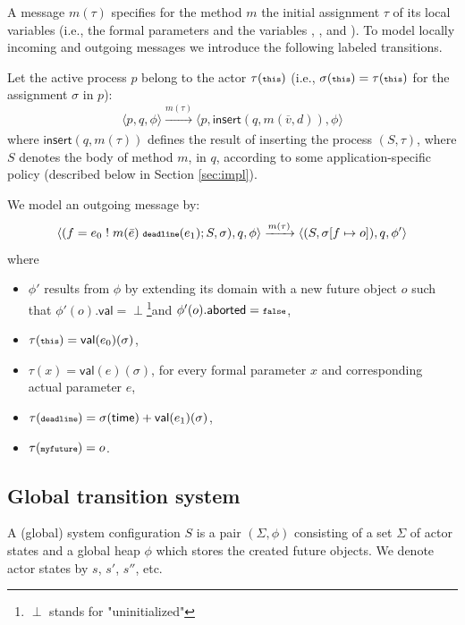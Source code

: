 \bigskip
A message $m(\tau)$ specifies for the method $m$ the  initial assignment $\tau$ of its  local variables
(i.e., the formal parameters and the variables , , and ).
To model locally incoming and outgoing  messages we introduce the following
labeled transitions.

Let the active process $p$ belong to the actor $\tau({\scriptsize\texttt{this}})$ (i.e., 
 $\sigma({\scriptsize\texttt{this}})=\tau({\scriptsize\texttt{this}})$ for the assignment $\sigma$ in $p$):
$$
\langle p , q, \phi\rangle \xrightarrow[]{m(\tau)}  \langle p , \mathsf{insert}(q, m(\overline{v}, d)), \phi\rangle
$$
where   $\mathsf{insert}(q, m(\tau))$  defines the result of inserting the process  $(S,\tau)$, where $S$ denotes the body of method $m$,
in $q$, according to some application-specific policy (described below in Section \ref{sec:impl}).


We model an outgoing message by:
$$
\langle (f = e_0 \; ! \; m(\bar{e}) \; \textbf{{\scriptsize\texttt{deadline}}}(e_1);S,\sigma)  , q, \phi\rangle 
\xrightarrow[]{m(\tau)} 
\langle (S,\sigma[f\mapsto o])  , q, \phi' \rangle 
$$
where 
\begin{itemize}\itemsep5pt
\item $\phi'$ results from $\phi$ by extending its domain  with a new future object $o$
such that $\phi'(o).\textsf{val}=\perp$\footnote{$\perp$ stands for "uninitialized"}and $\phi'(o).\textsf{aborted}={\scriptsize\texttt{false}}$,
 \item $\tau({\scriptsize\texttt{this}})=\textsf{val}(e_0)(\sigma)$,
 \item $\tau(x)= \textsf{val}(e)(\sigma)$, for every formal parameter $x$ and corresponding actual parameter $e$, 
 \item $\tau({\scriptsize\texttt{deadline}})=\sigma(\mathsf{time})+ \textsf{val}(e_1)(\sigma)$,
  \item  $\tau({\scriptsize\texttt{myfuture}})=o$.
\end{itemize}

\subsection{Global transition system}
A (global) system configuration $S$ is a pair $(\Sigma, \phi)$ consisting of a set $\Sigma$
of actor states and a global heap $\phi$ which stores the created future objects.
We denote actor states by $s$, $s'$, $s''$, etc.

